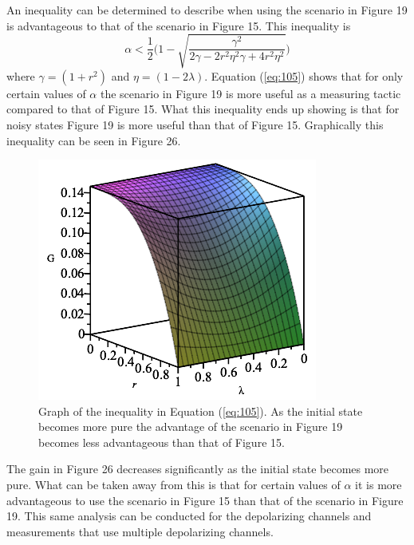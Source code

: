 \documentclass[twocolumn]{article}
\begin{document}
An inequality can be determined to describe when using the scenario in Figure 19 is advantageous to that of the scenario in Figure 15. This inequality is
\begin{equation}\label{eq:105}
\alpha < \frac{1}{2}\Bigg(1-\sqrt{\frac{\gamma^2}{2\gamma-2r^2\eta^2\gamma+4r^2\eta^2}}\Bigg)
\end{equation}
where $\gamma=(1+r^2)$ and $\eta=(1-2\lambda)$. Equation (\ref{eq:105}) shows that for only certain values of $\alpha$ the scenario in Figure 19 is more useful as a measuring tactic compared to that of Figure 15. What this inequality ends up showing is that for noisy states Figure 19 is more useful than that of Figure 15. Graphically this inequality can be seen in Figure 26.
\begin{figure}[h]
\begin{center}
\includegraphics[width=0.65\linewidth]{Phase-Flip-Alpha-Inequality-Graph.png}
\caption{Graph of the inequality in Equation (\ref{eq:105}). As the initial state becomes more pure the advantage of the scenario in Figure 19 becomes less advantageous than that of Figure 15.}
\end{center}
\end{figure}
\newline
The gain in Figure 26 decreases significantly as the initial state becomes more pure. What can be taken away from this is that for certain values of $\alpha$ it is more advantageous to use the scenario in Figure 15 than that of the scenario in Figure 19. This same analysis can be conducted for the depolarizing channels and measurements that use multiple depolarizing channels.
\end{document}
